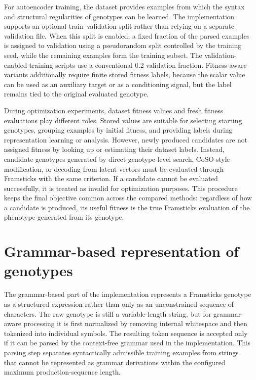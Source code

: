 For autoencoder training, the dataset provides examples from which the syntax and structural regularities of \fone{} genotypes can be learned. The implementation supports an optional train--validation split rather than relying on a separate validation file. When this split is enabled, a fixed fraction of the parsed examples is assigned to validation using a pseudorandom split controlled by the training seed, while the remaining examples form the training subset. The validation-enabled training scripts use a conventional 0.2 validation fraction. Fitness-aware variants additionally require finite stored fitness labels, because the scalar value can be used as an auxiliary target or as a conditioning signal, but the label remains tied to the original evaluated genotype.

During optimization experiments, dataset fitness values and fresh fitness evaluations play different roles. Stored values are suitable for selecting starting genotypes, grouping examples by initial fitness, and providing labels during representation learning or analysis. However, newly produced candidates are not assigned fitness by looking up or estimating their dataset labels. Instead, candidate genotypes generated by direct genotype-level search, CoSO-style modification, or decoding from latent vectors must be evaluated through Framsticks with the same \vertpos{} criterion. If a candidate cannot be evaluated successfully, it is treated as invalid for optimization purposes. This procedure keeps the final objective common across the compared methods: regardless of how a candidate is produced, its useful fitness is the true Framsticks evaluation of the phenotype generated from its \fone{} genotype.

\section{Grammar-based representation of \fone{} genotypes}

The grammar-based part of the implementation represents a Framsticks \fone{} genotype as a structured expression rather than only as an unconstrained sequence of characters. The raw genotype is still a variable-length string, but for grammar-aware processing it is first normalized by removing internal whitespace and then tokenized into individual \fone{} symbols. The resulting token sequence is accepted only if it can be parsed by the \fone{} context-free grammar used in the implementation. This parsing step separates syntactically admissible training examples from strings that cannot be represented as grammar derivations within the configured maximum production-sequence length.

